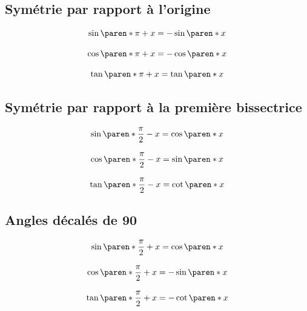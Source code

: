 \subsection{Symétrie par rapport à l'origine}
\begin{frame}
\begin{minipage}{0.5\linewidth}
\centering
\scalebox{0.75}{}
\end{minipage}
\begin{minipage}{0.45\linewidth}
\centering
\[\begin{array}{c}
\sin\paren*{ \pi +x} =-\sin\paren*{ x} \\ \\
\cos\paren*{ \pi +x} =-\cos\paren*{ x} \\ \\
\tan\paren*{ \pi +x} =\tan\paren*{ x}
\end{array}\]
\end{minipage}
\end{frame}
\subsection{Symétrie par rapport à la première bissectrice}
\begin{frame}
\begin{minipage}{0.58\linewidth}
\centering
\scalebox{0.75}{}
\end{minipage}
\begin{minipage}{0.40\linewidth}
\centering
\[\begin{array}{c}
\sin\paren*{ \dfrac{\pi}{2} -x} =\cos\paren*{ x} \\ \\
\cos\paren*{ \dfrac{\pi}{2} -x} =\sin\paren*{ x} \\ \\
\tan\paren*{ \dfrac{\pi}{2} -x} =\cot\paren*{ x}
\end{array}\]
\end{minipage}
\end{frame}

\subsection{Angles décalés de 90\degre}
\begin{frame}
\begin{minipage}{0.5\linewidth}
\centering
\scalebox{0.75}{}
\end{minipage}
\begin{minipage}{0.45\linewidth}
\centering
\[\begin{array}{c}
\sin\paren*{ \dfrac{\pi}{2} +x} =\cos\paren*{ x} \\
\\
\cos\paren*{ \dfrac{\pi}{2} +x} =-\sin\paren*{ x} \\
\\
\tan\paren*{ \dfrac{\pi}{2} +x} =-\cot\paren*{ x}
\end{array}\]
\end{minipage}
\end{frame}

